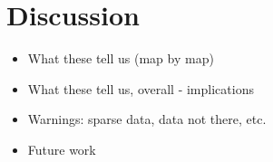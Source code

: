 \documentclass[11pt]{article}
\begin{document}
\section{Discussion}
\begin{itemize}
\item What these tell us (map by map)
\item What these tell us, overall - implications
\item Warnings: sparse data, data not there, etc. 
\item Future work 
%
\end{itemize}



\end{document}
